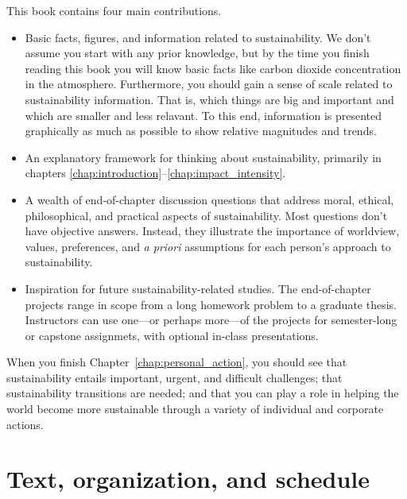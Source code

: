 {This book contains four main contributions.

\begin{itemize}

  \item Basic facts, figures, and information related to sustainability. 
        We don't assume you start with any prior knowledge, but by the time you finish 
        reading this book you will know basic facts like carbon dioxide 
        concentration in the atmosphere. 
        Furthermore, you should gain a sense of scale related to sustainability 
        information. 
        That is, which things are big and important and 
        which are smaller and less relavant. 
        To this end, information is presented graphically as much as possible 
        to show relative magnitudes and trends.
        
  \item An explanatory framework for thinking about sustainability,
        primarily in chapters \ref{chap:introduction}--\ref{chap:impact_intensity}.

  \item A wealth of end-of-chapter discussion questions that 
        address moral, ethical, philosophical,
        and practical aspects of sustainability. 
        Most questions don't have objective answers. 
        Instead, they illustrate the importance
        of worldview, values, preferences, and \emph{a priori} assumptions 
        for each person's approach to sustainability. 
        
  \item Inspiration for future sustainability-related studies.
        The end-of-chapter projects range in scope from a long
        homework problem to a graduate thesis. 
        Instructors can use one---or perhaps more---of the projects for
        semester-long or capstone assignmets,
        with optional in-class presentations.
      
\end{itemize}

When you finish Chapter~\ref{chap:personal_action}, you should see
that sustainability entails important, urgent, and difficult challenges; 
that sustainability transitions are needed; and 
that you can play a role in helping the world become more sustainable
through a variety of individual and corporate actions.


\section*{Text, organization, and schedule} 

}
